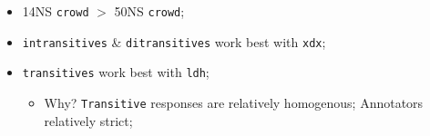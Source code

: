 \documentclass[xcolor={dvipsnames}]{beamer}
\newcommand{\param}[1]{\texttt{#1}}
\begin{document}
\begin{frame}
\begin{itemize}
\pause
\item 14NS \param{crowd} $>$ 50NS \param{crowd};
\pause
\item \param{intransitives} \& \param{ditransitives} work best with \param{xdx};
\pause
\item \param{transitives} work best with \param{ldh};
\begin{itemize}
\pause
\item Why? \param{Transitive} responses are relatively homogenous; Annotators relatively strict;
\end{itemize}
\end{itemize}

\end{frame}

\end{document}

